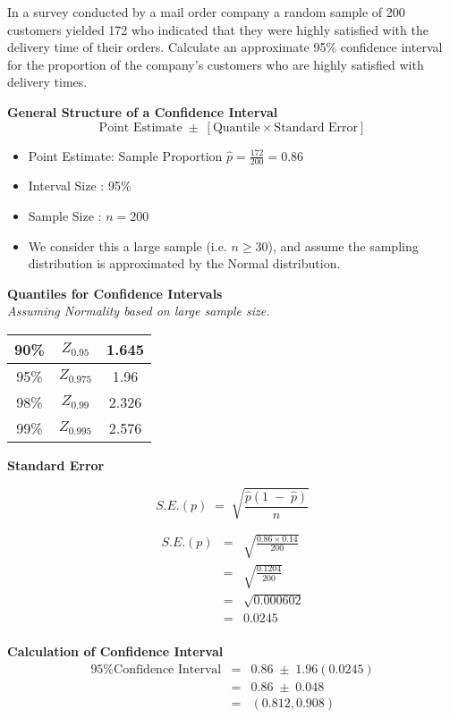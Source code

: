 \documentclass[a4paper,12pt]{article}
\begin{document}
\large
\noindent In a survey conducted by a mail order company a random sample of 200 customers yielded 172 who indicated that they were highly satisfied with the delivery time of their orders.
Calculate an approximate 95\% confidence interval for the proportion of the
company's customers who are highly satisfied with delivery times.

\begin{framed}
\noindent \textbf{General Structure of a Confidence Interval}
\[  \mbox{Point Estimate} \;\pm\; \left[ \mbox{Quantile} \times \mbox{Standard Error}\right]\]
\end{framed}


\begin{itemize}
\item Point Estimate: Sample Proportion ${ \displaystyle \hat{p} = \frac{172}{200} = 0.86 }$
\item Interval Size : 95\%
\item Sample Size : $n=200$
\item We consider this a large sample (i.e. $n \geq 30$), and assume the sampling distribution is approximated by the Normal distribution.
\end{itemize}
\noindent \textbf{Quantiles for Confidence Intervals}
\\ \textit{ Assuming Normality based on large sample size.}\\
\begin{center}
\begin{tabular}{|c|c|c|} \hline
90\%     & $Z_{0.95}$ & 1.645 \\ \hline
95\%     & $Z_{0.975}$ & 1.96 \\ \hline
98\%    & $Z_{0.99}$ & 2.326    \\ \hline
99\%    & $Z_{0.995}$ &  2.576  \\ \hline
\end{tabular}
\end{center}

\newpage
\noindent \textbf{Standard Error}
\begin{framed}
\[ S.E.(p) \;=\; \sqrt{ \frac{\hat{p} (1\;-\;\hat{p})  }{n}  } \]
\end{framed}
\begin{eqnarray*} S.E.(p) &=& \sqrt{ \frac{0.86 \times 0.14 }{200}  }\\
&=& \sqrt{ \frac{0.1204 }{200}  }\\
&=& \sqrt{ 0.000602 }\\
&=& 0.0245 \\
\end{eqnarray*}
\medskip

\noindent \textbf{Calculation of Confidence Interval}
\begin{eqnarray*}
\mbox{95\% Confidence Interval} &=& 0.86 \;\pm\; 1.96(0.0245)\\
&=& 0.86 \;\pm\; 0.048 \\
&=& (0.812, 0.908)\\
\end{eqnarray*}
\end{document}
